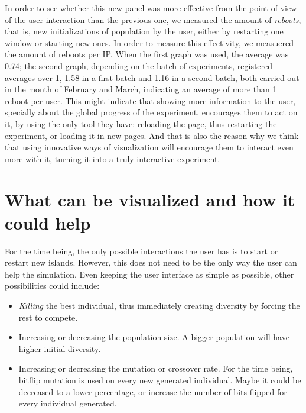 \documentclass{sig-alternate}
\begin{document}
In order to see whether this new panel was more effective from the
point of view of the user interaction than the previous one, we
measured the amount of {\em reboots}, that is, new initializations of
population by the user, either by restarting one window or starting
new ones. In order to measure this effectivity, we measuered the
amount of reboots per IP. When the first graph was used, the average
was 0.74; the second graph, depending on the batch of experiments,
registered averages over 1, 1.58 in a first batch and 1.16 in a second
batch, both carried out in the month of February and March, indicating
an average of more than 1 reboot per user. This might indicate that
showing more information to the user, specially about the global
progress of the experiment, encourages them to act on it, by using the
only tool they have: reloading the page, thus restarting the
experiment, or loading it in new pages. And that is also the reason
why we think that using innovative ways of visualization will
encourage them to interact even more with it, turning it into a truly
interactive experiment. 


\section{What can be visualized and how it could help}
\label{sec:conclusion}

For the time being, the only possible interactions the user has is to start  or
restart new islands. However, this does not need to be the only way the user 
can help the simulation. Even keeping the user interface as simple as
possible, other possibilities could include:\begin{itemize}
\item {\em Killing} the best individual, thus immediately creating
  diversity by forcing the rest to compete.
\item Increasing or decreasing the population size. A bigger
  population will have higher initial diversity.
\item Increasing or decreasing the mutation or crossover rate. For the time being,
  bitflip mutation is used on every new generated individual. Maybe it
  could be decreased to a lower percentage, or increase the number of
  bits flipped for every individual generated.
\end{itemize}
\end{document}
